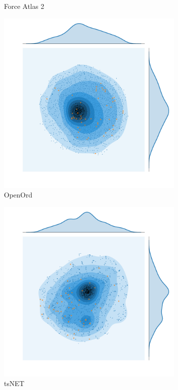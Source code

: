 \begin{figure}[H]
\begin{subfigure}[b]{.49\textwidth}
         \caption{Force Atlas 2}
         \label{fig:fa}
     \end{subfigure}
    \begin{subfigure}[b]{.49\textwidth}
         \centering \includegraphics[width=\textwidth,angle=-180]{figures_c1/layout/oo_aphh.pdf}
         \caption{OpenOrd}
         \label{fig:oo}
     \end{subfigure}
         \begin{subfigure}[b]{.49\textwidth}
         \centering \includegraphics[width=\textwidth,angle=-90]{figures_c1/layout/tsnet_aphh.pdf}
         \caption{tsNET}
         \label{fig:ts}
     \end{subfigure}
      \hfill
        \caption{ }
        \label{fig:densitycompare}
\end{figure}




